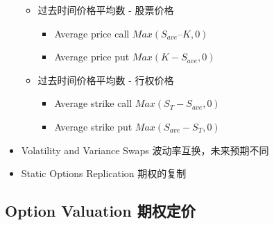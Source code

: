 \documentclass[a4paper,6pt,twoside,openany]{article}
\begin{document}
\begin{itemize}
\begin{itemize}
    \item 过去时间价格平均数 - 股票价格
      \begin{itemize}
      \item Average price call $Max(S_{ave} – K, 0)$
      \item Average price put $Max(K - S_{ave}, 0)$
      \end{itemize}
    \item 过去时间价格平均数 - 行权价格
      \begin{itemize}
      \item Average strike call $Max(S_T - S_{ave}, 0)$
      \item Average strike put $Max(S_{ave} - S_T, 0)$
      \end{itemize}
    \end{itemize}
  \item Volatility and Variance Swaps 波动率互换，未来预期不同
  \item Static Options Replication 期权的复制
\end{itemize}

\subsection{Option Valuation 期权定价}
\end{document}
